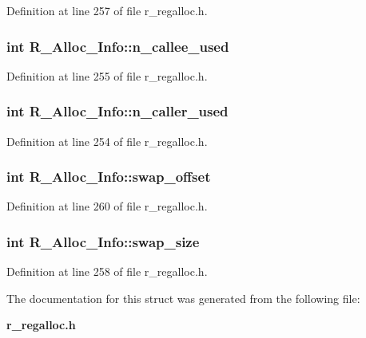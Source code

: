 Definition at line 257 of file r\_\-regalloc.h.
\subsubsection{\setlength{\rightskip}{0pt plus 5cm}int \bf{R\_\-Alloc\_\-Info::n\_\-callee\_\-used}}\label{structR__Alloc__Info_0a6900705e2215eb1bde3bf9c046d914}




Definition at line 255 of file r\_\-regalloc.h.
\subsubsection{\setlength{\rightskip}{0pt plus 5cm}int \bf{R\_\-Alloc\_\-Info::n\_\-caller\_\-used}}\label{structR__Alloc__Info_afbf1fbe2ce676bc53b5bbf5e7687f3c}




Definition at line 254 of file r\_\-regalloc.h.
\subsubsection{\setlength{\rightskip}{0pt plus 5cm}int \bf{R\_\-Alloc\_\-Info::swap\_\-offset}}\label{structR__Alloc__Info_da7fc27852ad89d8fe450dbbb5246f47}




Definition at line 260 of file r\_\-regalloc.h.
\subsubsection{\setlength{\rightskip}{0pt plus 5cm}int \bf{R\_\-Alloc\_\-Info::swap\_\-size}}\label{structR__Alloc__Info_fdca88fbb55977de18471dbf39eee4fb}




Definition at line 258 of file r\_\-regalloc.h.

The documentation for this struct was generated from the following file:\begin{CompactItemize}
\item 
\bf{r\_\-regalloc.h}\end{CompactItemize}

